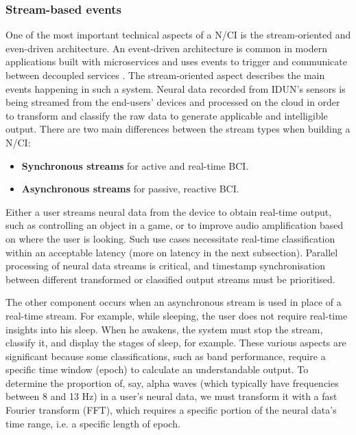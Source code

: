 \subsubsection{Stream-based events}
\label{chapter5-stream-based-events}

One of the most important technical aspects of a N/CI is the stream-oriented and even-driven architecture. An event-driven architecture is common in modern applications built with microservices and uses events to trigger and communicate between decoupled services \citep{amazon_web_services_inc_event-driven_nodate}. The stream-oriented aspect describes the main events happening in such a system. Neural data recorded from IDUN's sensors is being streamed from the end-users' devices and processed on the cloud in order to transform and classify the raw data to generate applicable and intelligible output. There are two main differences between the stream types when building a N/CI:

\begin{itemize}
\item \textbf{Synchronous streams} for active and real-time BCI.
\item \textbf{Asynchronous streams} for passive, reactive BCI.
\end{itemize}

Either a user streams neural data from the device to obtain real-time output, such as controlling an object in a game, or to improve audio amplification based on where the user is looking. Such use cases necessitate real-time classification within an acceptable latency (more on latency in the next subsection). Parallel processing of neural data streams is critical, and timestamp synchronisation between different transformed or classified output streams must be prioritised.

The other component occurs when an asynchronous stream is used in place of a real-time stream. For example, while sleeping, the user does not require real-time insights into his sleep. When he awakens, the system must stop the stream, classify it, and display the stages of sleep, for example. These various aspects are significant because some classifications, such as band performance, require a specific time window (epoch) to calculate an understandable output. To determine the proportion of, say, alpha waves (which typically have frequencies between 8 and 13 Hz) in a user's neural data, we must transform it with a fast Fourier transform (FFT), which requires a specific portion of the neural data's time range, i.e. a specific length of epoch. 

